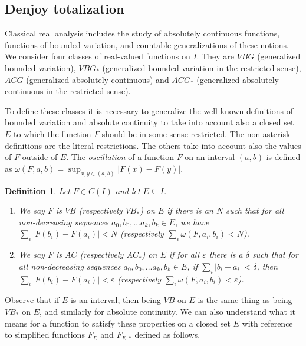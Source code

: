 \documentclass[12pt]{amsart}
\newtheorem{definition}{Definition}
\newcommand{\eps}{\varepsilon}
\begin{document}
\subsection{Denjoy totalization}
Classical real analysis includes the study of absolutely continuous 
functions, functions of bounded variation, and countable generalizations 
of these notions.  We consider four classes of real-valued 
functions on $I$.  They are $VBG$ (generalized bounded variation), 
$VBG_\ast$ (generalized bounded variation in the restricted sense), 
$ACG$ (generalized absolutely continuous) and $ACG_\ast$ (generalized 
absolutely continuous in the restricted sense).

To define these classes it is necessary to generalize the well-known 
definitions of bounded variation and absolute continuity to take into 
account also a closed set $E$ to which the function $F$ should be in some 
sense restricted.  The non-asterisk definitions are the literal 
restrictions.  The others take into account also the values 
of $F$ outside of $E$.  The \emph{oscillation} of a function 
$F$ on an interval $(a,b)$ is defined as 
$\omega(F,a,b) = \sup_{x,y \in (a,b)}
|F(x) - F(y)|$.

\begin{definition} Let $F\in C(I)$ and let $E\subseteq I$.
\begin{enumerate}
\item We say $F$ is $VB$ (respectively $VB_\ast$) on $E$
if there is an $N$ such that for all non-decreasing 
sequences $a_0,b_0,\dots a_k,b_k \in E$, 
we have $\sum_i |F(b_i) - F(a_i)| < N$ 
(respectively $\sum_i \omega(F,a_i,b_i) < N$). 
\item We say $F$ is $AC$ (respectively $AC_\ast$) on $E$
if for all $\eps$ there is a $\delta$ such 
that for all non-decreasing sequences $a_0,b_0,\dots a_k,b_k \in E$, if 
$\sum_i |b_i-a_i| < \delta$, then $\sum_i |F(b_i) - F(a_i)|<\eps$ 
(respectively $\sum_i \omega(F,a_i,b_i) < \eps$).
\end{enumerate}
\end{definition}

Observe that if $E$ is an interval, then being $VB$ on $E$ is the 
same thing as being $VB_\ast$ on $E$, and similarly for absolute 
continuity.  We can also understand what it means for 
a function to satisfy these properties on a closed set $E$ 
with reference to simplified 
functions $F_E$ and $F_{E,\ast}$ defined as follows.
\end{document}
